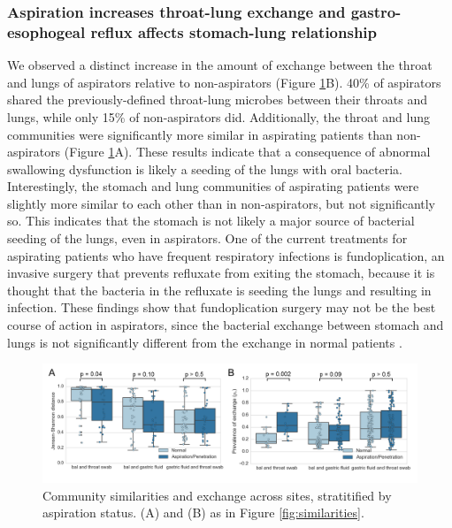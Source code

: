 \documentclass[12pt]{article}
\begin{document}
\subsubsection{Aspiration increases throat-lung exchange and gastro-esophogeal reflux affects stomach-lung relationship}

We observed a distinct increase in the amount of exchange between the 
throat and lungs of aspirators relative to non-aspirators (Figure \ref{fig:aspirators}B).
40\% of aspirators shared
the previously-defined throat-lung microbes between their throats and lungs, while only 15\% of 
non-aspirators did. Additionally, the throat and lung communities
were significantly more similar in aspirating patients than non-aspirators (Figure \ref{fig:aspirators}A). These results indicate that a consequence of abnormal swallowing
dysfunction is likely a seeding of the lungs with oral bacteria.
Interestingly, the stomach and lung communities of aspirating
patients were slightly more similar to each other than in non-aspirators, but not significantly so.
This indicates that the stomach is not likely a major source
of bacterial seeding of the lungs, even in aspirators. One of the current treatments for
aspirating patients who have frequent respiratory infections is fundoplication,
an invasive surgery that prevents refluxate from exiting the stomach, because it is thought
that the bacteria in the refluxate is seeding the lungs
and resulting in infection.
These findings show that fundoplication surgery may not be the best course of action in aspirators, since 
the bacterial exchange between stomach and lungs is not
significantly different from the exchange in normal patients \cite{debenedictis-asp_dis-2009, kawahara-fundo-2004}.

\begin{figure}[h]
\begin{center}
	\includegraphics[scale=0.65]{aspiration}
	\caption{Community similarities and exchange across sites, stratitified by aspiration status.
	(A) and (B) as in Figure \ref{fig:similarities}.}
	\label{fig:aspirators}
\end{center}
\end{figure}
\end{document}
